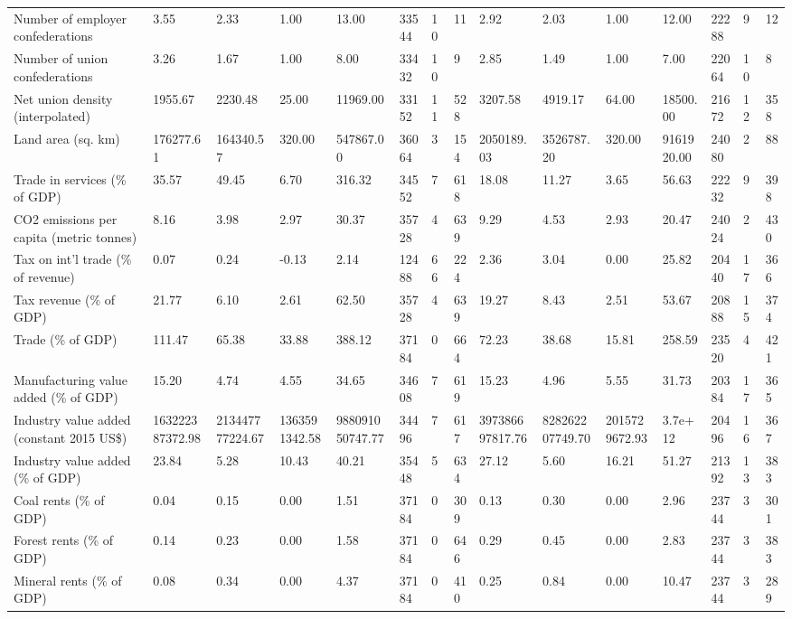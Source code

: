 \begin{longtable}{lllllllllllllll}
\addlinespace
Number of employer confederations & 3.55 & 2.33 & 1.00 & 13.00 & 33544 & 10 & 11 & 2.92 & 2.03 & 1.00 & 12.00 & 22288 & 9 & 12\\
Number of union confederations & 3.26 & 1.67 & 1.00 & 8.00 & 33432 & 10 & 9 & 2.85 & 1.49 & 1.00 & 7.00 & 22064 & 10 & 8\\
Net union density (interpolated) & 1955.67 & 2230.48 & 25.00 & 11969.00 & 33152 & 11 & 528 & 3207.58 & 4919.17 & 64.00 & 18500.00 & 21672 & 12 & 358\\
Land area (sq. km) & 176277.61 & 164340.57 & 320.00 & 547867.00 & 36064 & 3 & 154 & 2050189.03 & 3526787.20 & 320.00 & 9161920.00 & 24080 & 2 & 88\\
Trade in services (\% of GDP) & 35.57 & 49.45 & 6.70 & 316.32 & 34552 & 7 & 618 & 18.08 & 11.27 & 3.65 & 56.63 & 22232 & 9 & 398\\
\addlinespace
CO2 emissions per capita (metric tonnes) & 8.16 & 3.98 & 2.97 & 30.37 & 35728 & 4 & 639 & 9.29 & 4.53 & 2.93 & 20.47 & 24024 & 2 & 430\\
Tax on int'l trade (\% of revenue) & 0.07 & 0.24 & -0.13 & 2.14 & 12488 & 66 & 224 & 2.36 & 3.04 & 0.00 & 25.82 & 20440 & 17 & 366\\
Tax revenue (\% of GDP) & 21.77 & 6.10 & 2.61 & 62.50 & 35728 & 4 & 639 & 19.27 & 8.43 & 2.51 & 53.67 & 20888 & 15 & 374\\
Trade (\% of GDP) & 111.47 & 65.38 & 33.88 & 388.12 & 37184 & 0 & 664 & 72.23 & 38.68 & 15.81 & 258.59 & 23520 & 4 & 421\\
Manufacturing value added (\% of GDP) & 15.20 & 4.74 & 4.55 & 34.65 & 34608 & 7 & 619 & 15.23 & 4.96 & 5.55 & 31.73 & 20384 & 17 & 365\\
\addlinespace
Industry value added (constant 2015 US\$) & 163222387372.98 & 213447777224.67 & 1363591342.58 & 988091050747.77 & 34496 & 7 & 617 & 397386697817.76 & 828262207749.70 & 2015729672.93 & 3.7e+12 & 20496 & 16 & 367\\
Industry value added (\% of GDP) & 23.84 & 5.28 & 10.43 & 40.21 & 35448 & 5 & 634 & 27.12 & 5.60 & 16.21 & 51.27 & 21392 & 13 & 383\\
Coal rents (\% of GDP) & 0.04 & 0.15 & 0.00 & 1.51 & 37184 & 0 & 309 & 0.13 & 0.30 & 0.00 & 2.96 & 23744 & 3 & 301\\
Forest rents (\% of GDP) & 0.14 & 0.23 & 0.00 & 1.58 & 37184 & 0 & 646 & 0.29 & 0.45 & 0.00 & 2.83 & 23744 & 3 & 383\\
Mineral rents (\% of GDP) & 0.08 & 0.34 & 0.00 & 4.37 & 37184 & 0 & 410 & 0.25 & 0.84 & 0.00 & 10.47 & 23744 & 3 & 289\\

\end{longtable}
